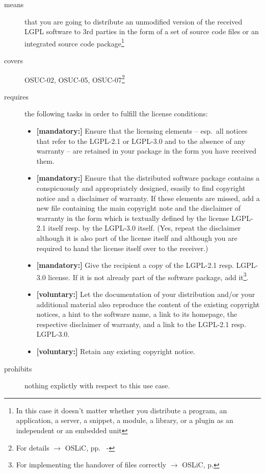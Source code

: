 \begin{description}

\item[means] that you are going to distribute an unmodified version of the
received LGPL software to 3rd parties in the form of a set of source code files
or an integrated source code package\footnote{In this case it doesn't matter
whether you  distribute a program, an application, a server, a snippet, a
module, a library, or a plugin as an independent or an embedded unit}

\item[covers] OSUC-02, OSUC-05, OSUC-07\footnote{For details $\rightarrow$
OSLiC, pp.\ \pageref{OSUC-02-DEF} - \pageref{OSUC-07-DEF}}

\item[requires] the following tasks in order to fulfill the license conditions:
\begin{itemize}
 
  \item \textbf{[mandatory:]} Ensure that the licensing elements -- esp.\ all
  notices that refer to the LGPL-2.1 or LGPL-3.0 and to the absence of any
  warranty -- are retained in your package in the form you have received them.

  \item \textbf{[mandatory:]} Ensure that the distributed software package
  contains a conspicuously and appropriately designed, esasily to find copyright
  notice and a disclaimer of warranty. If these elements are missed, add a new
  file containing the main copyright note and the disclaimer of warranty in the
  form which is textually defined by the license LGPL-2.1 itself resp. by the
  LGPL-3.0 itself. (Yes, repeat the disclaimer although it is also part of the
  license itself and although you are required to hand the license itself over
  to the receiver.)
  
  \item \textbf{[mandatory:]} Give the recipient a copy of the LGPL-2.1 resp.
  LGPL-3.0 license. If it is not already part of the software package, add
  it\footnote{For implementing the handover of files correctly $\rightarrow$
  OSLiC, p. \pageref{DistributingFilesHint}}.
  
  \item \textbf{[voluntary:]} Let the documentation of your distribution and/or
  your additional material also reproduce the content of the existing
  copyright notices, a hint to the software name, a link to its homepage,
  the respective disclaimer of warranty, and a link to the LGPL-2.1 resp.
  LGPL-3.0.
  
  \item \textbf{[voluntary:]} Retain any existing copyright notice. 
  
\end{itemize}

\item[prohibits] nothing explictly with respect to this use case.

\end{description}


